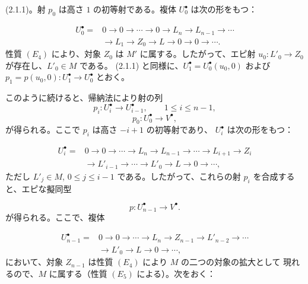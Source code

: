 \clearpage
{}%
\begingroup\small\setlength{\parskip}{0pt}\setlength{\emergencystretch}{1.5em}
\setlength{\abovedisplayskip}{4pt plus 2pt minus 2pt}%
\setlength{\belowdisplayskip}{4pt plus 2pt minus 2pt}%

(2.1.1)。射 $p_0$ は高さ $1$ の初等射である。複体 $U_0^\bullet$ は次の形をもつ：

\[
\begin{aligned}
U_0^\bullet={}&0\longrightarrow0\longrightarrow\cdots\longrightarrow0
\longrightarrow L_n\longrightarrow L_{n-1}\longrightarrow\cdots\\
&\longrightarrow L_1\longrightarrow Z_0\longrightarrow L
\longrightarrow0\longrightarrow0\longrightarrow\cdots.
\end{aligned}
\]
性質 $(E_4)$ により、対象 $Z_0$ は $M'$ に属する。したがって、エピ射
$u_0\colon L'_0\longrightarrow Z_0$ が存在し、$L'_0\in M$ である。
(2.1.1) と同様に、$U_1^\bullet=U_0^\bullet(u_0,0)$ および
$p_1=p(u_0,0)\colon U_1^\bullet\longrightarrow U_0^\bullet$ とおく。

このように続けると、帰納法により射の列
\[
p_i\colon U_i^\bullet\longrightarrow U_{i-1}^\bullet,
\qquad 1\leq i\leq n-1,
\]
\[
p_0\colon U_0^\bullet\longrightarrow V^\bullet,
\]
が得られる。ここで $p_i$ は高さ $-i+1$ の初等射であり、
$U_i^\bullet$ は次の形をもつ：

\[
\begin{aligned}
U_i^\bullet={}&0\longrightarrow0\longrightarrow\cdots
\longrightarrow L_n\longrightarrow L_{n-1}\longrightarrow\cdots
\longrightarrow L_{i+1}\longrightarrow Z_i\\
&\longrightarrow L'_{i-1}\longrightarrow\cdots\longrightarrow L'_0
\longrightarrow L\longrightarrow0\longrightarrow\cdots ,
\end{aligned}
\]
ただし $L'_j\in M$, $0\leq j\leq i-1$ である。したがって、これらの射
$p_i$ を合成すると、エピな擬同型

\[
p\colon U_{n-1}^\bullet\longrightarrow V^\bullet.
\]
が得られる。ここで、複体

\[
\begin{aligned}
U_{n-1}^\bullet={}&0\longrightarrow0\longrightarrow\cdots
\longrightarrow L_n\longrightarrow Z_{n-1}\longrightarrow L'_{n-2}
\longrightarrow\cdots\\
&\longrightarrow L'_0\longrightarrow L\longrightarrow0
\longrightarrow\cdots ,
\end{aligned}
\]
において、対象 $Z_{n-1}$ は性質 $(E_4)$ により $M$ の二つの対象の拡大として
現れるので、$M$ に属する（性質 $(E_5)$ による）。次をおく：


